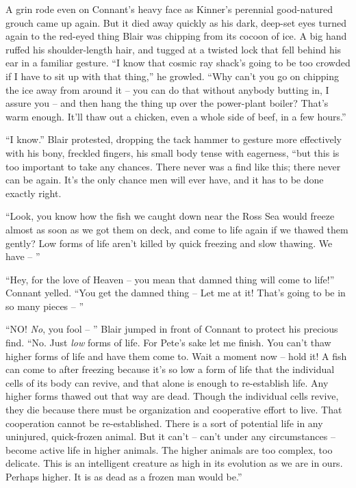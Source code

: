\documentclass[ebook,oneside,11pt]{memoir}				%
\begin{document}
A grin rode even on Connant's heavy face as Kinner's perennial good-natured grouch came up again. But it died away quickly as his dark, deep-set eyes turned again to the red-eyed thing Blair was chipping from its cocoon of ice. A big hand ruffed his shoulder-length hair, and tugged at a twisted lock that fell behind his ear in a familiar gesture. ``I know that cosmic ray shack's going to be too crowded if I have to sit up with that thing,'' he growled. ``Why can't you go on chipping the ice away from around it -- you can do that without anybody butting in, I assure you -- and then hang the thing up over the power-plant boiler? That's warm enough. It'll thaw out a chicken, even a whole side of beef, in a few hours.''

``I know.'' Blair protested, dropping the tack hammer to gesture more effectively with his bony, freckled fingers, his small body tense with eagerness, ``but this is too important to take any chances. There never was a find like this; there never can be again. It's the only chance men will ever have, and it has to be done exactly right.

``Look, you know how the fish we caught down near the Ross Sea would freeze almost as soon as we got them on deck, and come to life again if we thawed them gently? Low forms of life aren't killed by quick freezing and slow thawing. We have -- ''

``Hey, for the love of Heaven -- you mean that damned thing will come to life!'' Connant yelled. ``You get the damned thing -- Let me at it! That's going to be in so many pieces -- ''

``NO! \emph{No}, you fool -- '' Blair jumped in front of Connant to protect his precious find. ``No. Just \emph{low} forms of life. For Pete's sake let me finish. You can't thaw higher forms of life and have them come to. Wait a moment now -- hold it! A fish can come to after freezing because it's so low a form of life that the individual cells of its body can revive, and that alone is enough to re-establish life. Any higher forms thawed out that way are dead. Though the individual cells revive, they die because there must be organization and cooperative effort to live. That cooperation cannot be re-established. There is a sort of potential life in any uninjured, quick-frozen animal. But it can't -- can't under any circumstances -- become active life in higher animals. The higher animals are too complex, too delicate. This is an intelligent creature as high in its evolution as we are in ours. Perhaps higher. It is as dead as a frozen man would be.''
\end{document}

